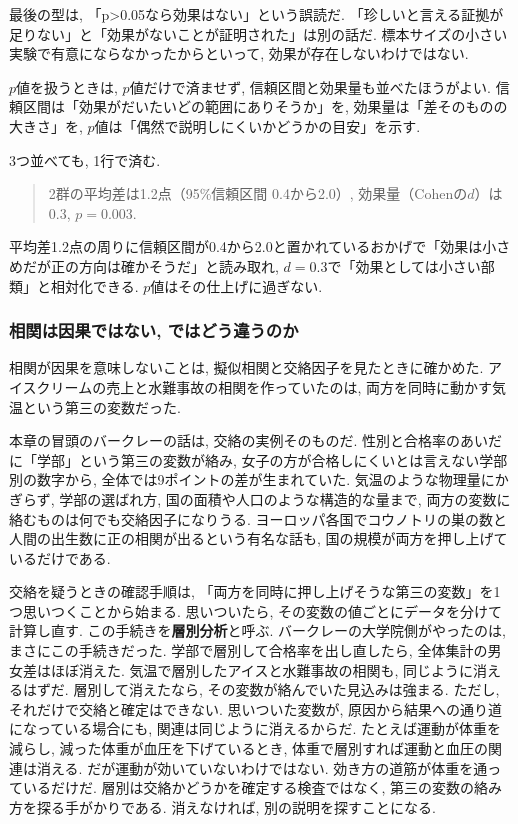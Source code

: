 最後の型は, 「p>0.05なら効果はない」という誤読だ.
「珍しいと言える証拠が足りない」と「効果がないことが証明された」は別の話だ.
標本サイズの小さい実験で有意にならなかったからといって, 効果が存在しないわけではない.

$p$値を扱うときは, $p$値だけで済ませず, 信頼区間と効果量も並べたほうがよい.
信頼区間は「効果がだいたいどの範囲にありそうか」を, 効果量は「差そのものの大きさ」を, $p$値は「偶然で説明しにくいかどうかの目安」を示す.

3つ並べても, 1行で済む.

\begin{quote}
2群の平均差は1.2点（95\%信頼区間 0.4から2.0）, 効果量（Cohenの$d$）は0.3, $p = 0.003$.
\end{quote}

平均差1.2点の周りに信頼区間が0.4から2.0と置かれているおかげで「効果は小さめだが正の方向は確かそうだ」と読み取れ, $d = 0.3$で「効果としては小さい部類」と相対化できる. $p$値はその仕上げに過ぎない.

\subsubsection*{相関は因果ではない, ではどう違うのか}

相関が因果を意味しないことは, 擬似相関と交絡因子を見たときに確かめた.
アイスクリームの売上と水難事故の相関を作っていたのは, 両方を同時に動かす気温という第三の変数だった.

本章の冒頭のバークレーの話は, 交絡の実例そのものだ.
性別と合格率のあいだに「学部」という第三の変数が絡み, 女子の方が合格しにくいとは言えない学部別の数字から, 全体では9ポイントの差が生まれていた.
気温のような物理量にかぎらず, 学部の選ばれ方, 国の面積や人口のような構造的な量まで, 両方の変数に絡むものは何でも交絡因子になりうる.
ヨーロッパ各国でコウノトリの巣の数と人間の出生数に正の相関が出るという有名な話も, 国の規模が両方を押し上げているだけである.

交絡を疑うときの確認手順は, 「両方を同時に押し上げそうな第三の変数」を1つ思いつくことから始まる.
思いついたら, その変数の値ごとにデータを分けて計算し直す. この手続きを\textbf{層別分析}と呼ぶ.
バークレーの大学院側がやったのは, まさにこの手続きだった. 学部で層別して合格率を出し直したら, 全体集計の男女差はほぼ消えた.
気温で層別したアイスと水難事故の相関も, 同じように消えるはずだ.
層別して消えたなら, その変数が絡んでいた見込みは強まる. ただし, それだけで交絡と確定はできない.
思いついた変数が, 原因から結果への通り道になっている場合にも, 関連は同じように消えるからだ.
たとえば運動が体重を減らし, 減った体重が血圧を下げているとき, 体重で層別すれば運動と血圧の関連は消える.
だが運動が効いていないわけではない. 効き方の道筋が体重を通っているだけだ.
層別は交絡かどうかを確定する検査ではなく, 第三の変数の絡み方を探る手がかりである.
消えなければ, 別の説明を探すことになる.


